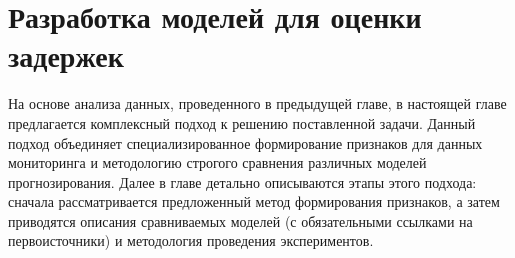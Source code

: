 \chapter{Разработка моделей для оценки задержек}
\label{ch:modeling}

\hspace*{1.25cm}На основе анализа данных, проведенного в предыдущей главе, в настоящей главе предлагается комплексный подход к решению поставленной задачи. Данный подход объединяет специализированное формирование признаков для данных мониторинга и методологию строгого сравнения различных моделей прогнозирования. Далее в главе детально описываются этапы этого подхода: сначала рассматривается предложенный метод формирования признаков, а затем приводятся описания сравниваемых моделей (с обязательными ссылками на первоисточники) и методология проведения экспериментов.



